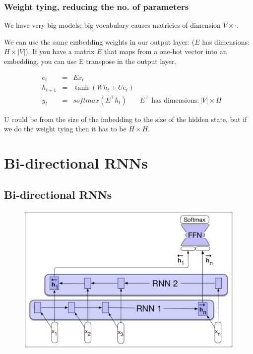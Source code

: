 \documentclass[11pt]{article}
\begin{document}
\subsubsection{Weight tying, reducing the no. of parameters}

We have very big models; big vocabulary causes matricies of dimension $V\times \cdot$.

We can use the same embedding weights in our output layer: ($E$ has dimensions: $H \times |V|$). If you have a matrix $E$ that maps from a one-hot vector into an embedding, you can use E transpose in the output layer.

\begin{align*}
    & e_t & = & Ex_t & \\ 
    & h_{t+1} & = & \tanh(Wh_t + Ue_t) & \\
    & y_t & = & softmax(E^\top h_t) & E^\top \text{ has dimensions}: |V| \times H
\end{align*}

U could be from the size of the imbedding to the size of the hidden state, but if we do the weight tying then it has to be $H \times H$.

\section{Bi-directional RNNs}

\subsection{Bi-directional RNNs}

\begin{figure}[H]
    \centering
    \includegraphics[width=\linewidth]{figures/bi-directional-rnn.png}
\end{figure}
\end{document}
